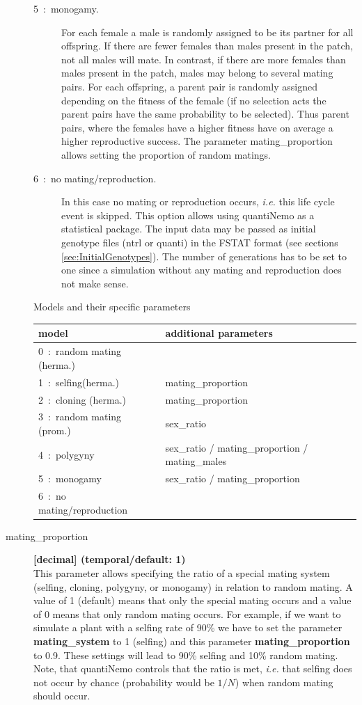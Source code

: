 \documentclass[letterpaper,12pt,oneside]{book}
\begin{document}
\begin{description}
\begin{description}
\item [5~:~monogamy.] For each female a male is randomly assigned to be its partner for all offspring. If there are fewer females than males present in the patch, not all males will mate. In contrast, if there are more females than males present in the patch, males may belong to several mating pairs. For each offspring, a parent pair is randomly assigned depending on the fitness of the female (if no selection acts the parent pairs have the same probability to be selected). Thus parent pairs, where the females have a higher fitness have on average a higher reproductive success. The parameter \textsf{mating\_proportion} allows setting the proportion of random matings.

\item [6~:~no mating/reproduction.] In this case no mating or reproduction occurs, \textit{i.e.} this life cycle event is skipped. This option allows using quantiNemo as a statistical package. The input data may be passed as initial genotype files (ntrl or quanti) in the FSTAT format (see sections \ref{sec:InitialGenotypes}). The number of generations has to be set to one since a simulation without any mating and reproduction does not make sense.

\end{description}

Models and their specific parameters\\

\begin{tabular}{ll}
 \hline model & additional parameters \\ 
 \hline  0~:~random mating (herma.) & \\
 1~:~selfing(herma.)      & mating\_proportion \\
 2~:~cloning (herma.)      & mating\_proportion \\
 3~:~random mating (prom.) & sex\_ratio \\
 4~:~polygyny              & sex\_ratio / mating\_proportion / mating\_males \\
 5~:~monogamy              & sex\_ratio / mating\_proportion \\
 6~:~no mating/reproduction & \\
 \hline
\end{tabular}

\item[mating\_proportion\index{mating\_proportion}] \textbf{[decimal] (temporal/default: 1)}\\
This parameter allows specifying the ratio of a special mating system (selfing, cloning, polygyny, or monogamy) in relation to random mating. A value of 1 (default) means that only the special mating occurs and a value of 0 means that only random mating occurs. For example, if we want to simulate a plant with a selfing rate of 90\% we have to set the parameter \textbf{mating\_system} to 1 (selfing) and this parameter \textbf{mating\_proportion} to 0.9. These settings will lead to 90\% selfing and 10\% random mating. Note, that quantiNemo controls that the ratio is met, \textit{i.e.} that selfing does not occur by chance (probability would be $1/N$) when random mating should occur.


\end{description}
\end{document}
